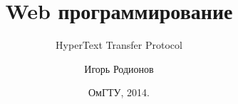 \documentclass[10pt]{beamer}
\title[Web]{Web программирование}
\subtitle[HTTP]{HyperText Transfer Protocol}
\author[Родионов И.Н.]{Игорь Родионов}
\institute[ОмГТУ ИВТ]{Омский Государственный Технический Университет\\
	{\tiny кафедра Информатики и вычислительной техники}\\
}
\date[2014]{ОмГТУ, 2014.}
\begin{document}
\begin{frame}[plain]
\maketitle
\end{frame}


















\end{document}
